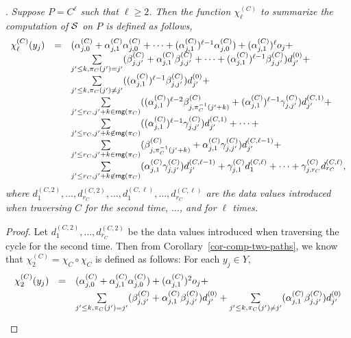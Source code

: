 \begin{appendix}
.
{\it Suppose $P=C^{\ell}$ such that $\ell \ge 2$. Then the function $\chi^{(C)}_{\ell}$ to summarize the computation of ${\mathcal{S} }$ on $P$ is defined as follows,
\[
\begin{array}{l c l}
\chi^{(C)}_{\ell}(y_j)  & = & (\alpha^{(C)}_{j,0} + \alpha^{(C)}_{j,1} \alpha^{(C)}_{j,0}+ \dots +(\alpha^{(C)}_{j,1})^{\ell-1} \alpha^{(C)}_{j,0}) + (\alpha^{(C)}_{j,1})^\ell o_j + \\
& & \sum \limits_{j' \le k, \pi_C(j')=j'} (\beta^{(C)}_{j,j'}+\alpha^{(C)}_{j,1}\beta^{(C)}_{j,j'} + \dots +(\alpha^{(C)}_{j,1})^{\ell-1}  \beta^{(C)}_{j,j'}) d^{(0)}_{j'} + \\
%
& & \sum \limits_{j'\le k, \pi_C(j') \neq j'} ((\alpha^{(C)}_{j,1})^{\ell-1} \beta^{(C)}_{j,j'}) d^{(0)}_{j'} +  \\
%
& & \sum \limits_{j' \le r_C, j'+k \in \rng(\pi_C)} ( (\alpha^{(C)}_{j,1})^{\ell-2} \beta^{(C)}_{j, \pi_C^{-1}(j'+k)} +(\alpha^{(C)}_{j,1})^{\ell-1}\gamma^{(C)}_{j,j'}) d^{(C,1)}_{j'} + \\
%
& & \sum \limits_{j' \le r_C,  j'+k \not \in \rng(\pi_C)} ((\alpha^{(C)}_{j,1})^{\ell-1} \gamma^{(C)}_{j,j'}) d^{(C,1)}_{j'} + \dots + \\
%
& & \sum \limits_{j' \le r_C, j'+k \in \rng(\pi_C)} (\beta^{(C)}_{j, \pi_C^{-1}(j'+k)}+\alpha^{(C)}_{j,1}\gamma^{(C)}_{j,j'}) d^{(C,\ell-1)}_{j'} + \\
%
& & \sum \limits_{j' \le r_C,  j'+k \not \in \rng(\pi_C)} (\alpha^{(C)}_{j,1} \gamma^{(C)}_{j,j'}) d^{(C,\ell-1)}_{j'} + \gamma^{(C)}_{j, 1} d^{(C,\ell)}_{1} + \dots + \gamma^{(C)}_{j,r_C} d^{(C,\ell)}_{r_C},
\end{array} 
\]
where $d^{(C,2)}_{1},\dots, d^{(C,2)}_{r_C},\dots, d^{(C,\ell)}_{1},\dots,d^{(C,\ell)}_{r_C}$
 are the data values introduced when traversing $C$ for the second time, $\dots$, and for $\ell$ times.
}
%
\begin{proof}
Let $d^{(C,2)}_{1},\dots,d^{(C,2)}_{r_C}$ be the data values introduced when traversing the cycle for the second time. Then from Corollary~\ref{cor-comp-two-paths}, we know that $\chi^{(C)}_2 = \chi_{C} \circ \chi_C$ is defined as follows: For each $y_j \in Y$,
\[
\begin{array}{l c l}
\smallskip
\chi^{(C)}_2(y_j) & =  & (\alpha^{(C)}_{j,0}+\alpha^{(C)}_{j,1} \alpha^{(C)}_{j,0})+ (\alpha^{(C)}_{j,1})^2 o_j + \\
%
\smallskip
& & \sum \limits_{j' \le k, \pi_C(j')=j'} (\beta^{(C)}_{j,j'}+\alpha^{(C)}_{j,1} \beta^{(C)}_{j,j'}) d^{(0)}_{j'} + \sum \limits_{j' \le k, \pi_C(j') \neq j'} (\alpha^{(C)}_{j,1} \beta^{(C)}_{j,j'}) d^{(0)}_{j'}  \\

\end{array}\]
\end{proof}
\end{appendix}
